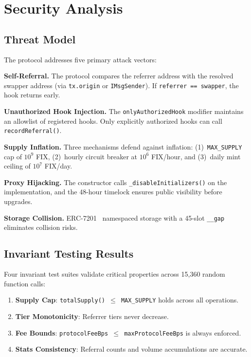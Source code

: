 \documentclass[conference]{IEEEtran}
\begin{document}
\section{Security Analysis}
\label{sec:security}

\subsection{Threat Model}

The protocol addresses five primary attack vectors:

\textbf{Self-Referral.} The protocol compares the referrer address with the resolved swapper address (via \texttt{tx.origin} or \texttt{IMsgSender}). If \texttt{referrer == swapper}, the hook returns early.

\textbf{Unauthorized Hook Injection.} The \texttt{onlyAuthorizedHook} modifier maintains an allowlist of registered hooks. Only explicitly authorized hooks can call \texttt{recordReferral()}.

\textbf{Supply Inflation.} Three mechanisms defend against inflation: (1)~\texttt{MAX\_SUPPLY} cap of $10^9$ FIX, (2)~hourly circuit breaker at $10^6$ FIX/hour, and (3)~daily mint ceiling of $10^7$ FIX/day.

\textbf{Proxy Hijacking.} The constructor calls \texttt{\_disableInitializers()} on the implementation, and the 48-hour timelock ensures public visibility before upgrades.

\textbf{Storage Collision.} ERC-7201~\cite{erc7201} namespaced storage with a 45-slot \texttt{\_\_gap} eliminates collision risks.

\subsection{Invariant Testing Results}

Four invariant test suites validate critical properties across 15,360 random function calls:

\begin{enumerate}
    \item \textbf{Supply Cap}: \texttt{totalSupply() $\leq$ MAX\_SUPPLY} holds across all operations.
    \item \textbf{Tier Monotonicity}: Referrer tiers never decrease.
    \item \textbf{Fee Bounds}: \texttt{protocolFeeBps $\leq$ max\-Protocol\-Fee\-Bps} is always enforced.
    \item \textbf{Stats Consistency}: Referral counts and volume accumulations are accurate.
\end{enumerate}
\end{document}
